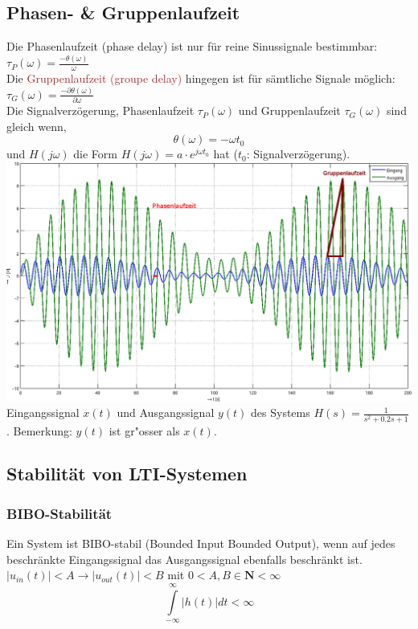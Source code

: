 \subsection{Phasen- \& Gruppenlaufzeit }
Die \textcolor{phase}{Phasenlaufzeit (phase delay)}  ist nur für reine Sinussignale bestimmbar:
$\tau_P(\omega)=\frac{-\theta(\omega)}{\omega}$ \\
Die \textcolor{brown}{Gruppenlaufzeit (groupe delay)} hingegen ist für sämtliche Signale möglich:
$\tau_G(\omega)=\frac{-\partial\theta(\omega)}{\partial\omega}$\\
Die Signalverzögerung, Phasenlaufzeit $\tau_P(\omega)$ und Gruppenlaufzeit $\tau_G(\omega)$ sind
gleich wenn,
\begin{equation}
	\theta(\omega) = -\omega t_0 \nonumber
\end{equation}
und $H(j\omega)$ die Form $H(j\omega) = a\cdot e^{j\omega t_0}$ hat ($t_0$: Signalverzögerung).\\
\includegraphics[width=18cm]{./bilder/laufzeit.png}\\
Eingangssignal $x(t)$ und Ausgangssignal $y(t)$ des Systems
$H(s)=\frac{1}{s^2+0.2s+1}$. Bemerkung: $y(t)$ ist gr"osser als $x(t)$.

\subsection{Stabilität von LTI-Systemen }
\subsubsection{BIBO-Stabilität }
	Ein System ist BIBO-stabil (Bounded Input Bounded Output), wenn auf jedes
	beschränkte Eingangssignal das Ausgangssignal ebenfalls beschränkt ist.
	$|u_{in}(t)| < A \rightarrow |u_{out}(t)| < B$ mit $0 < A,B \in \mathbf{N} < \infty$
	\begin{equation}
		\int\limits_{-\infty}^{\infty} |h(t)| dt < \infty \nonumber
	\end{equation}

